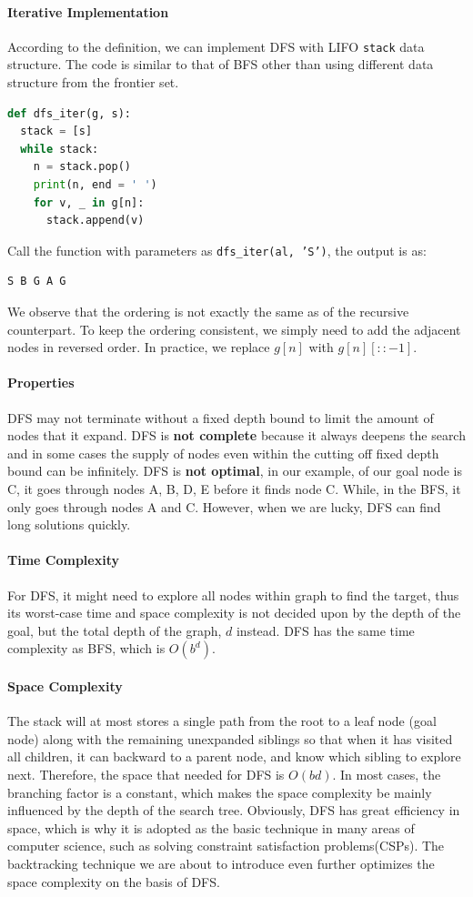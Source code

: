 \documentclass[../main.tex]{subfiles}
\begin{document}
\paragraph{Iterative Implementation} According to the definition, we can implement DFS with LIFO \texttt{stack} data structure. The code is similar to that of BFS other than using different data structure from the frontier set.
\begin{lstlisting}[language=Python]
def dfs_iter(g, s):
  stack = [s]
  while stack:
    n = stack.pop()
    print(n, end = ' ')
    for v, _ in g[n]:
      stack.append(v)
\end{lstlisting}
Call the function with parameters as \texttt{dfs\_iter(al, 'S')}, the output is as:
\begin{lstlisting}[numbers=none]
S B G A G 
\end{lstlisting}
We observe that the ordering is not exactly the same as of the recursive counterpart. To keep the ordering consistent, we simply need to add the adjacent nodes in reversed order. In practice, we replace \texttt{$g[n]$} with \texttt{$g[n][::-1]$}.

\paragraph{Properties} DFS may not terminate without a fixed depth bound to limit the amount of nodes that it expand. DFS is \textbf{not complete} because it always deepens the search and in some cases the supply of nodes even within the cutting off fixed depth bound can be infinitely. DFS is \textbf{not optimal}, in our example, of our goal node is C, it goes through nodes A, B, D, E before it finds node C. While, in the BFS, it only goes through nodes A and C. However, when we are lucky, DFS can find long solutions quickly.

\paragraph{Time Complexity} 
For DFS, it might need to explore all nodes within  graph to find the target, thus its worst-case time and space complexity is not decided upon by the depth of the goal, but the total depth of the graph, $d$ instead. DFS has the same time complexity as BFS, which is   $O(b^d)$.

\paragraph{Space Complexity} The stack will at most stores  a single path from the root to a leaf node (goal node) along with the  remaining unexpanded siblings so that when it has visited all children, it can backward to a parent node, and know which sibling to explore next. Therefore, the space that needed for DFS is $O(bd)$. In most cases, the branching factor is a constant, which makes the space complexity be mainly influenced by the depth of the search tree. Obviously, DFS has great efficiency in space, which is why it is adopted as the basic technique in many areas of computer science, such as solving constraint satisfaction problems(CSPs). The backtracking technique we are about to introduce even further  optimizes the space complexity on the basis of DFS.
\end{document}
